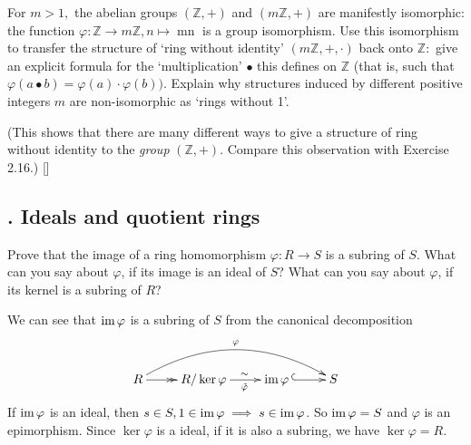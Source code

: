 \documentclass[12pt,letterpaper,boxed]{hmcpset}
\newcommand{\im}{\mathrm{im}\hspace{1.5pt}}
\begin{document}
\begin{problem}[2.15]
	For $m>1,$ the abelian groups $(\mathbb{Z},+)$ and $(m \mathbb{Z},+)$ are manifestly isomorphic: the function $\varphi: \mathbb{Z} \rightarrow m \mathbb{Z}, n \mapsto \operatorname{mn}$ is a group isomorphism. Use this isomorphism to transfer the structure of `ring without identity' $(m \mathbb{Z},+, \cdot)$ back onto $\mathbb{Z}:$ give an explicit formula for the `multiplication' $\bullet$ this defines on $\mathbb{Z}$ (that is, such that $\varphi(a \bullet b)=\varphi(a) \cdot \varphi(b))$. Explain why structures induced by different positive integers $m$ are non-isomorphic as `rings without 1'.
	
	(This shows that there are many different ways to give a structure of ring without identity to the \emph{group} $(\mathbb{Z},+)$. Compare this observation with Exercise 2.16.) []
\end{problem}
\begin{solution}

\end{solution}


\subsection{. Ideals and quotient rings}

\begin{problem}[3.1]
Prove that the image of a ring homomorphism $\varphi: R \to S$ is a subring of $S$. What can you say about $\varphi$, if its image is an ideal of $S$? What can you say about $\varphi$, if its kernel is a subring of $R$?
\end{problem}
\begin{solution}
We can see that $\im \varphi$ is a subring of $S$ from the canonical decomposition
\[\xymatrix{
	R\ar@/^2pc/@{->}[rrr]^{\varphi}\ar@{->>}[r]^{}&R/\ker \varphi \ar@{->}[r]^{\hspace{1em}\sim\hspace{4pt}}_{\hspace{1em}\tilde{\varphi}\hspace{4pt}}&\im \varphi\hspace{2pt}\ar@{^{(}->}[r]^{}&S
}\] 
If $\im \varphi$ is an ideal, then $s\in S,1\in\im\varphi \implies s\in \im\varphi$. So $\im \varphi=S$ and $\varphi$ is an epimorphism. Since $\ker\varphi$ is a ideal, if it is also a subring, we have $\ker \varphi=R$.
\end{solution}
\end{document}

